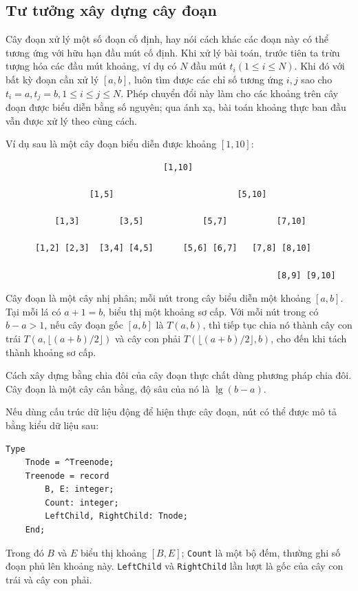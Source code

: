 \documentclass[11pt]{article}
\begin{document}
\subsection{Tư tưởng xây dựng cây đoạn}

Cây đoạn xử lý một số đoạn cố định, hay nói cách khác các đoạn này có thể
tương ứng với hữu hạn đầu mút cố định. Khi xử lý bài toán, trước tiên ta trừu
tượng hóa các đầu mút khoảng, ví dụ có \(N\) đầu mút \(t_i(1\le i\le N)\).
Khi đó với bất kỳ đoạn cần xử lý \([a,b]\), luôn tìm được các chỉ số tương
ứng \(i,j\) sao cho \(t_i=a,t_j=b,1\le i\le j\le N\). Phép chuyển đổi này
làm cho các khoảng trên cây đoạn được biểu diễn bằng số nguyên; qua ánh xạ,
bài toán khoảng thực ban đầu vẫn được xử lý theo cùng cách.

Ví dụ sau là một cây đoạn biểu diễn được khoảng \([1,10]\):

\begin{verbatim}
                                [1,10]

                 [1,5]                         [5,10]

          [1,3]        [3,5]            [5,7]          [7,10]

      [1,2] [2,3]  [3,4] [4,5]      [5,6] [6,7]   [7,8] [8,10]

                                                       [8,9] [9,10]
\end{verbatim}

Cây đoạn là một cây nhị phân; mỗi nút trong cây biểu diễn một khoảng
\([a,b]\). Tại mỗi lá có \(a+1=b\), biểu thị một khoảng sơ cấp. Với mỗi nút
trong có \(b-a>1\), nếu cây đoạn gốc \([a,b]\) là \(T(a,b)\), thì tiếp tục
chia nó thành cây con trái \(T(a,\lfloor(a+b)/2\rfloor)\) và cây con phải
\(T(\lfloor(a+b)/2\rfloor,b)\), cho đến khi tách thành khoảng sơ cấp.

Cách xây dựng bằng chia đôi của cây đoạn thực chất dùng phương pháp chia đôi.
Cây đoạn là một cây cân bằng, độ sâu của nó là \(\lg(b-a)\).

Nếu dùng cấu trúc dữ liệu động để hiện thực cây đoạn, nút có thể được mô tả
bằng kiểu dữ liệu sau:

\begin{verbatim}
Type
    Tnode = ^Treenode;
    Treenode = record
        B, E: integer;
        Count: integer;
        LeftChild, RightChild: Tnode;
    End;
\end{verbatim}

Trong đó \(B\) và \(E\) biểu thị khoảng \([B,E]\); \texttt{Count} là một bộ
đếm, thường ghi số đoạn phủ lên khoảng này. \texttt{LeftChild} và
\texttt{RightChild} lần lượt là gốc của cây con trái và cây con phải.
\end{document}
